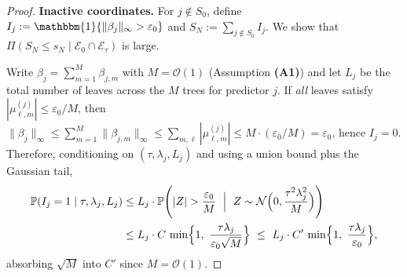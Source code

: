 \documentclass[11pt]{article}
\theoremstyle{plain}
\theoremstyle{definition}
\theoremstyle{plain}
\begin{document}
\begin{proof}

\medskip\noindent
\textbf{Inactive coordinates.}
For $j\notin S_0$, define $I_j:=\mathbbm{1}\{\|\beta_j\|_\infty>\varepsilon_0\}$ and
$S_N:=\sum_{j\notin S_0} I_j$. We show that
$\Pi(S_N\le s_N\mid \mathcal E_0\cap\mathcal E_\tau)$ is large.

Write $\beta_j=\sum_{m=1}^M \beta_{j,m}$ with $M= \mathcal{O}(1)$ (Assumption \textbf{(A1)}) and let $L_j$ be the total number
of leaves across the $M$ trees for predictor $j$. If \emph{all} leaves satisfy
$|\mu^{(j)}_{\ell,m}|\le \varepsilon_0/M$, then $\|\beta_j\|_\infty\le \sum_{m=1}^M\|\beta_{j,m}\|_\infty
\le \sum_{m,\ell}|\mu^{(j)}_{\ell,m}|\le M\cdot(\varepsilon_0/M)=\varepsilon_0$, hence $I_j=0$.
Therefore, conditioning on $(\tau,\lambda_j,L_j)$ and using a union bound plus the Gaussian tail,
\begin{align}
\mathbb P(I_j=1\mid \tau,\lambda_j,L_j)
&\le L_j\cdot \mathbb P\!\left(|Z|>\frac{\varepsilon_0}{M}\ \Bigm|\ Z\sim \mathcal{N} \Big(0,\frac{\tau^2\lambda_j^2}{M}\Big)\right)\nonumber\\
&\le L_j\cdot C\,\min \Bigl\{1,\ \frac{\tau\lambda_j}{\varepsilon_0\sqrt{M}}\Bigr\}
\ \le\ L_j\cdot C'\,\min \Bigl\{1,\ \frac{\tau\lambda_j}{\varepsilon_0}\Bigr\},
\label{eq:Ij-union-new}
\end{align}
absorbing $\sqrt{M}$ into $C'$ since $M=\mathcal{O}(1)$.


\end{proof}
\end{document}
